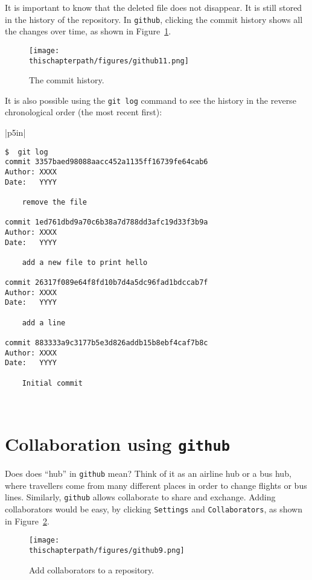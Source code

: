 It is important to know that the deleted file does not disappear. It is still
stored in the history of the repository. In {\tt github}, clicking the commit
history shows all the changes over time, as shown in Figure~\ref{fig:github11}.

\begin{figure}[h] \centering
{\texttt{[image: \\thischapterpath/figures/github11.png]}}
\caption{The commit history.}
\label{fig:github11}
\end{figure}

It is also possible using the {\tt git log} command to see the history in
the reverse chronological order (the most recent first):

\vspace{0.2in}
\noindent
\begin{tabular}{|p{5in}|}\hline
\begin{verbatim}
$  git log
commit 3357baed98088aacc452a1135ff16739fe64cab6
Author: XXXX
Date:   YYYY

    remove the file

commit 1ed761dbd9a70c6b38a7d788dd3afc19d33f3b9a
Author: XXXX
Date:   YYYY

    add a new file to print hello

commit 26317f089e64f8fd10b7d4a5dc96fad1bdccab7f
Author: XXXX
Date:   YYYY

    add a line

commit 883333a9c3177b5e3d826addb15b8ebf4caf7b8c
Author: XXXX
Date:   YYYY

    Initial commit
\end{verbatim}
\\ \hline
\end{tabular}
\vspace{0.2in}

\section{Collaboration using {\tt github}}

Does does ``hub'' in {\tt github} mean? Think of it as an airline hub
or a bus hub, where travellers come from many different places in
order to change flights or bus lines.  Similarly, {\tt github} allows
collaborate to share and exchange.  Adding collaborators would be
easy, by clicking {\tt Settings} and {\tt Collaborators}, as shown
in Figure~\ref{fig:github9}.

\begin{figure}[h] \centering
{\texttt{[image: \\thischapterpath/figures/github9.png]}}
\caption{Add collaborators to a repository.}
\label{fig:github9}
\end{figure}

